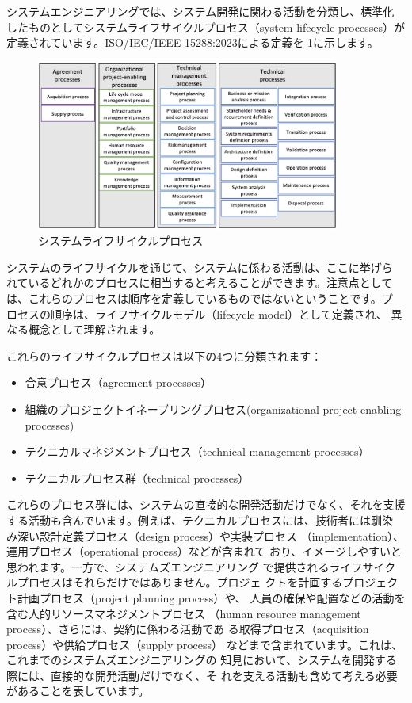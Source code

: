 システムエンジニアリングでは、システム開発に関わる活動を分類し、標準化
したものとしてシステムライフサイクルプロセス（system lifecycle
  processes）が定義されています。ISO/IEC/IEEE 15288:2023による定義を
\ref{figure:ch4-2}に示します。
\begin{figure}
    \begin{center}
    \includegraphics[width=100mm,bb=0 0 756 424]{safety_assurance_contents/ch4images/fig2.png}
    \caption{システムライフサイクルプロセス}
    \label{figure:ch4-2}
    \end{center}
\end{figure}

システムのライフサイクルを通じて、システムに係わる活動は、ここに挙げら
れているどれかのプロセスに相当すると考えることができます。注意点として
は、これらのプロセスは順序を定義しているものではないということです。プ
ロセスの順序は、ライフサイクルモデル（lifecycle model）として定義され、
異なる概念として理解されます。

これらのライフサイクルプロセスは以下の4つに分類されます：

\begin{itemize}
    \item 合意プロセス（agreement processes）
    \item 組織のプロジェクトイネーブリングプロセス(organizational project-enabling processes)
    \item テクニカルマネジメントプロセス（technical management processes）
    \item テクニカルプロセス群（technical processes）
\end{itemize}

これらのプロセス群には、システムの直接的な開発活動だけでなく、それを支援
する活動も含んでいます。例えば、テクニカルプロセスには、技術者には馴染
み深い設計定義プロセス（design process）や実装プロセス
（implementation）、運用プロセス（operational process）などが含まれて
おり、イメージしやすいと思われます。一方で、システムズエンジニアリング
で提供されるライフサイクルプロセスはそれらだけではありません。プロジェ
クトを計画するプロジェクト計画プロセス（project planning process）や、
人員の確保や配置などの活動を含む人的リソースマネジメントプロセス
（human resource management process）、さらには、契約に係わる活動であ
る取得プロセス（acquisition process）や供給プロセス（supply process）
などまで含まれています。これは、これまでのシステムズエンジニアリングの
知見において、システムを開発する際には、直接的な開発活動だけでなく、そ
れを支える活動も含めて考える必要があることを表しています。

